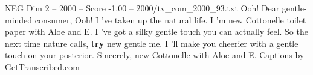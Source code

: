 \begin{textsample}{NEG Dim 2 – 2000 – Score -1.00 – 2000/tv\_com\_2000\_93.txt}  \label{ex:f2_neg_013}
Ooh!
Dear gentle-minded consumer, Ooh!
I 've taken up the natural life.
I 'm new Cottonelle toilet paper with Aloe and E.
I 've got a silky gentle touch you can actually feel.
So the next time nature calls, \textbf{try} new gentle me.
I 'll make you cheerier with a gentle touch on your posterior.
Sincerely, new Cottonelle with Aloe and E.
Captions by GetTranscribed.com

\end{textsample}
